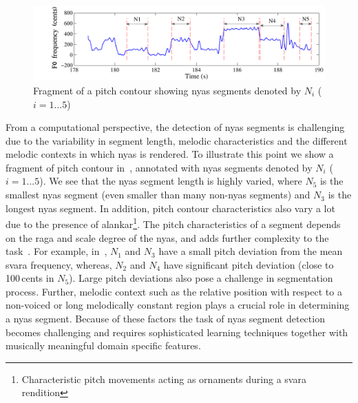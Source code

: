 {\begin{figure}
	\begin{center}
		\includegraphics[width=\figSizeHundred]{ch05_preprocessing/figures/NyasFragmentChallenge.pdf}
	\end{center}
	\caption[Fragment of a pitch contour showing \gls{nyas} segments]{Fragment of a pitch contour showing \gls{nyas} segments denoted by $N_i$ ($i={1...5}$)}
	\label{fig:nyas_segments_example}
\end{figure}

From a computational perspective, the detection of \gls{nyas} segments is challenging due to the variability in segment length, melodic characteristics and the different melodic contexts in which \gls{nyas} is rendered. To illustrate this point we show a fragment of pitch contour in~, annotated with \gls{nyas} segments denoted by $N_i$ ($i={1...5}$). We see that the \gls{nyas} segment length is highly varied, where $N_5$ is the smallest \gls{nyas} segment (even smaller than many non-\gls{nyas} segments) and $N_3$ is the longest \gls{nyas} segment. In addition, pitch contour characteristics also vary a lot due to the presence of \gls{alankar}\footnote{Characteristic pitch movements acting as ornaments during a \gls{svara} rendition}. The pitch characteristics of a segment depends on the \gls{raga} and scale degree of the \gls{nyas}, and adds further complexity to the task~\citep{Bagchee1998}. For example, in~, $N_1$ and $N_3$ have a small pitch deviation from the mean \gls{svara} frequency, whereas, $N_2$ and $N_4$ have significant pitch deviation (close to 100\,cents in $N_5$). Large pitch deviations also pose a challenge in segmentation process. Further, melodic context such as the relative position with respect to a non-voiced or long melodically constant region plays a crucial role in determining a \gls{nyas} segment. Because of these factors the task of \gls{nyas} segment detection becomes challenging and requires sophisticated learning techniques together with musically meaningful domain specific features.

}
